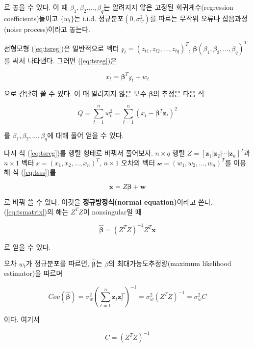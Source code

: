 \documentclass[b5paper,]{scrbook}
\theoremstyle{plain}
\theoremstyle{definition}
\numberwithin{equation}{section}
\begin{document}
로 놓을 수 있다. 이 때 \(\beta_{1},\beta_{2}.\ldots , \beta_{q}\)는
알려지지 않은 고정된 회귀계수(regression coefficients)들이고
\(\{ w_{t}\}\)는 i.i.d. 정규분포\((0,\sigma_{w}^{2})\)를 따르는 무작위
오류나 잡음과정(noise process)이라고 놓는다.

선형모형 (\eqref{eq:tsreg})은 일반적으로 벡터
\(\mathcal{z}_{t}=(z_{t1},z_{t2},\ldots , z_{tq})^{T}\),
\(\boldsymbol{\beta}(\beta_{1},\beta_{2},\ldots ,\beta_{q})^{T}\)를 써서
나타낸다. 그러면 (\eqref{eq:tsreg})은

\begin{equation}\label{eq:tsregvec}
x_{t}=\boldsymbol{\beta}^{T}\mathcal{z}_{t}+w_{t}
\end{equation}

으로 간단히 쓸 수 있다. 이 때 알려지지 않은 모수
\(\boldsymbol{\beta}\)의 추정은 다음 식

\begin{equation}\label{eq:tsss}
Q=\sum_{t=1}^{n}w_{t}^{2}=\sum_{t=1}^{n}(x_{t}-\boldsymbol{\beta}^{T}\mathbf{z}_{t})^{2}
\end{equation}

를 \(\beta_{1},\beta_{2},\ldots ,\beta_{q}\)에 대해 풀어 얻을 수 있다.

다시 식 (\eqref{eq:tsreg})를 행렬 형태로 바꿔서 풀어보자. \(n\times q\)
행렬
\(Z= [\mathbf{z}_{1} | \mathbf{z}_{2} | \cdots | \mathbf{z}_{n} ]^{T}\)과
\(n \times 1\) 벡터 \(\mathcal{x}=(x_{1},x_{2},\ldots , x_{n})^{T}\),
\(n \times 1\) 오차의 벡터
\(\mathcal{w}=(w_{1},w_{2}, \ldots, w_{n})^{T}\)를 이용해 식
(\eqref{eq:tsss})를

\begin{equation}\label{eq:tsmatrix}
\mathbf{x}=Z\boldsymbol{\beta}+\mathbf{w}
\end{equation}

로 바꿔 쓸 수 있다. 이것을 \textbf{정규방정식(normal equation)}이라고
쓴다. (\eqref{eq:tsmatrix})의 해는 \(Z^{T}Z\)이 nonsingular일 때

\[\hat{\boldsymbol{\beta}}=(Z^{T}Z)^{-1}Z^{T}\mathbf{x}\]

로 얻을 수 있다.

오차 \(w_{t}\)가 정규분포를 따르면, \(\hat{\boldsymbol{\beta}}\)는
\(\beta\)의 최대가능도추정량(maximum likelihood estimator)을 따르며

\[Cov(\hat{\boldsymbol{\beta}})=\sigma_{w}^{2}(\sum_{t=1}^{n}\mathbf{z}_{t}\mathbf{z}_{t}^{T})^{-1}=\sigma_{w}^{2}(Z^{T}Z)^{-1}=\sigma_{w}^{2}C\]

이다. 여기서

\[C=(Z^{T}Z)^{-1}\]
\end{document}
